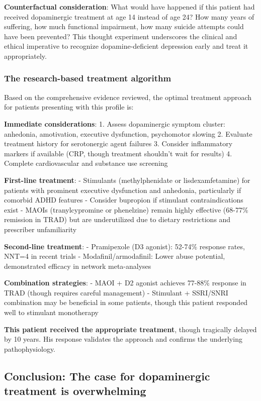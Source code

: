 \textbf{Counterfactual consideration}: What would have happened if this patient had received dopaminergic treatment at age 14 instead of age 24? How many years of suffering, how much functional impairment, how many suicide attempts could have been prevented? This thought experiment underscores the clinical and ethical imperative to recognize dopamine-deficient depression early and treat it appropriately.

\subsubsection{The research-based treatment algorithm}\label{10a_trd_basis-the-research-based-treatment-algorithm}

Based on the comprehensive evidence reviewed, the optimal treatment approach for patients presenting with this profile is:

\textbf{Immediate considerations}: 1. Assess dopaminergic symptom cluster: anhedonia, amotivation, executive dysfunction, psychomotor slowing 2. Evaluate treatment history for serotonergic agent failures 3. Consider inflammatory markers if available (CRP, though treatment shouldn't wait for results) 4. Complete cardiovascular and substance use screening

\textbf{First-line treatment}: - Stimulants (methylphenidate or lisdexamfetamine) for patients with prominent executive dysfunction and anhedonia, particularly if comorbid ADHD features - Consider bupropion if stimulant contraindications exist - MAOIs (tranylcypromine or phenelzine) remain highly effective (68-77\% remission in TRAD) but are underutilized due to dietary restrictions and prescriber unfamiliarity

\textbf{Second-line treatment}: - Pramipexole (D3 agonist): 52-74\% response rates, NNT=4 in recent trials - Modafinil/armodafinil: Lower abuse potential, demonstrated efficacy in network meta-analyses

\textbf{Combination strategies}: - MAOI + D2 agonist achieves 77-88\% response in TRAD (though requires careful management) - Stimulant + SSRI/SNRI combination may be beneficial in some patients, though this patient responded well to stimulant monotherapy

\textbf{This patient received the appropriate treatment}, though tragically delayed by 10 years. His response validates the approach and confirms the underlying pathophysiology.

\subsection{Conclusion: The case for dopaminergic treatment is overwhelming}\label{10a_trd_basis-conclusion-the-case-for-dopaminergic-treatment-is-overwhelming}

